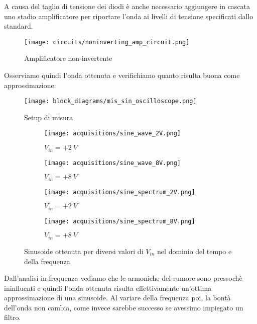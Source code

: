 A causa del taglio di tensione dei diodi è anche necessario aggiungere in cascata uno stadio
amplificatore per riportare l'onda ai livelli di tensione specificati dallo standard.

\begin{figure}[H]
    \centering
    \texttt{[image: circuits/noninverting\_amp\_circuit.png]}
    \caption{Amplificatore non-invertente}
    \label{noninverting_amp_circuit}
\end{figure}

Osserviamo quindi l'onda ottenuta e verifichiamo quanto risulta buona come approssimazione:

\begin{figure}[H]
    \centering
    \texttt{[image: block\_diagrams/mis\_sin\_oscilloscope.png]}
    \caption{Setup di misura}
    \label{mis_sin_oscilloscope}
\end{figure}

\begin{figure}[H]
    \centering

    \begin{subfigure}{.5\textwidth}
        \centering
        \texttt{[image: acquisitions/sine\_wave\_2V.png]}
        \caption{$V_{in}=+2\ V$}
        \label{acq_sine_2V}
    \end{subfigure}%
    \begin{subfigure}{.5\textwidth}
        \centering
        \texttt{[image: acquisitions/sine\_wave\_8V.png]}
        \caption{$V_{in}=+8\ V$}
        \label{acq_sine_8V}
    \end{subfigure}
    \begin{subfigure}{.5\textwidth}
        \centering
        \texttt{[image: acquisitions/sine\_spectrum\_2V.png]}
        \caption{$V_{in}=+2\ V$}
        \label{acq_fourier_2V}
    \end{subfigure}%
    \begin{subfigure}{.5\textwidth}
        \centering
        \texttt{[image: acquisitions/sine\_spectrum\_8V.png]}
        \caption{$V_{in}=+8\ V$}
        \label{acq_fourier_8V}
    \end{subfigure}

    \caption{Sinusoide ottenuta per diversi valori di $V_{in}$ nel dominio del tempo e
        della frequenza}
    \label{acq_sine}
\end{figure}

Dall'analisi in frequenza vediamo che le armoniche del rumore sono pressochè ininfluenti e
quindi l'onda ottenuta risulta effettivamente un'ottima approssimazione di una sinusoide.
Al variare della frequenza poi, la bontà dell'onda non cambia, come invece sarebbe successo
se avessimo impiegato un filtro.

